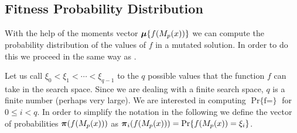 \documentclass{article}
\def\vec#1{\mathchoice{\mbox{\boldmath$\displaystyle#1$}}
  {\mbox{\boldmath$\textstyle#1$}}
  {\mbox{\boldmath$\scriptstyle#1$}}
  {\mbox{\boldmath$\scriptscriptstyle#1$}}}
\newcommand{\Prob}[1]{\mathop{\mathrm{Pr}\{#1\}}}
\begin{document}
\subsection{Fitness Probability Distribution}
\label{subsec:fitness-prob-distr}

With the help of the moments vector $\vec{\mu}\{f(M_p(x))\}$ we can compute the probability distribution of the values of $f$ in a mutated solution. In order to do this we proceed in the same way as \cite{Sutton2011foga}. 

Let us call $\xi_0 < \xi_1 < \cdots < \xi_{q-1}$ to the $q$ possible values that the function $f$ can take in the search space. Since we are dealing with a finite search space, $q$ is a finite number (perhaps very large). We are interested in computing $\Prob{f(M_p(x))=\xi_i}$ for $0 \leq i < q$. In order to simplify the notation in the following we define the vector of probabilities $\vec{\pi}(f(M_p(x)))$ as $\vec{\pi}_i(f(M_p(x)))=\Prob{f(M_p(x))=\xi_i}$.
\end{document}
